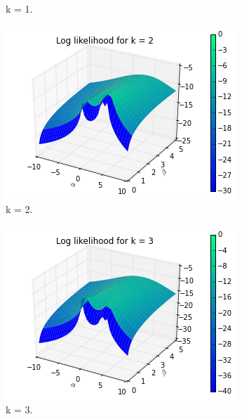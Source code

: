 \documentclass[a4paper,10pt]{article}
\numberwithin{equation}{section} %
\numberwithin{figure}{section} %
\numberwithin{table}{section} %
\theoremstyle{mytheor}
\begin{document}
\begin{enumerate}
\begin{figure}[h!]
\begin{subfigure}[b]{0.45\textwidth}
				\caption{k = 1.}
			\end{subfigure}
			\begin{subfigure}[b]{0.45\textwidth}
				\includegraphics[width=\textwidth]{llhk2.png}
				\caption{k = 2.}
			\end{subfigure}
			\begin{subfigure}[b]{0.45\textwidth}
				\includegraphics[width=\textwidth]{llhk3.png}
				\caption{k = 3.}
			\end{subfigure}
			\begin{subfigure}[b]{0.45\textwidth}

\end{subfigure}
\end{figure}
\end{enumerate}
\end{document}
